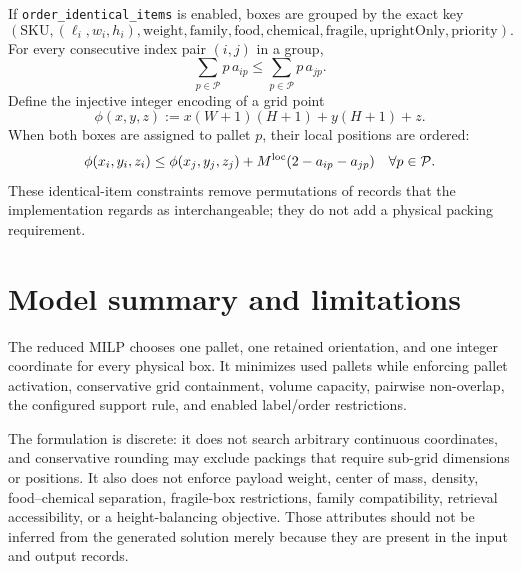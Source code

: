 \documentclass[11pt]{article}
\newcommand{\Pallets}{\mathcal P}
\begin{document}
If \texttt{order\_identical\_items} is enabled, boxes are grouped by the exact
key
\begin{equation}
 (\mathrm{SKU},(\ell_i,w_i,h_i),\mathrm{weight},\mathrm{family},
 \mathrm{food},\mathrm{chemical},\mathrm{fragile},
 \mathrm{uprightOnly},\mathrm{priority}).
 \label{eq:identical-key}
\end{equation}
For every consecutive index pair $(i,j)$ in a group,
\begin{equation}
 \sum_{p\in\Pallets}p\,a_{ip}
 \le\sum_{p\in\Pallets}p\,a_{jp}.
 \label{eq:identical-pallet-order}
\end{equation}
Define the injective integer encoding of a grid point
\begin{equation}
 \phi(x,y,z):=x(W+1)(H+1)+y(H+1)+z.
 \label{eq:location-encoding}
\end{equation}
When both boxes are assigned to pallet $p$, their local positions are ordered:
\begin{equation}
 \phi(x_i,y_i,z_i)
 \le\phi(x_j,y_j,z_j)+M^{\rm loc}(2-a_{ip}-a_{jp})
 \quad\forall p\in\Pallets.
 \label{eq:identical-location-order}
\end{equation}
These identical-item constraints remove permutations of records that the
implementation regards as interchangeable; they do not add a physical packing
requirement.

\section{Model summary and limitations}

The reduced MILP chooses one pallet, one retained orientation, and one integer
coordinate for every physical box.  It minimizes used pallets while enforcing
pallet activation, conservative grid containment, volume capacity, pairwise
non-overlap, the configured support rule, and enabled label/order restrictions.

The formulation is discrete: it does not search arbitrary continuous
coordinates, and conservative rounding may exclude packings that require
sub-grid dimensions or positions.  It also does not enforce payload weight,
center of mass, density, food--chemical separation, fragile-box restrictions,
family compatibility, retrieval accessibility, or a height-balancing
objective.  Those attributes should not be inferred from the generated
solution merely because they are present in the input and output records.
\end{document}
